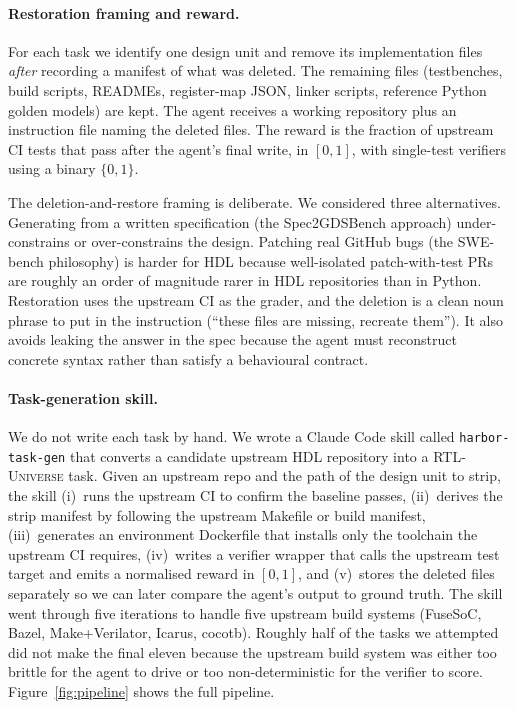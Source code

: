 \documentclass{article}
\begin{document}
\paragraph{Restoration framing and reward.}
For each task we identify one design unit and remove its implementation files \emph{after}
recording a manifest of what was deleted. The remaining files (testbenches, build scripts,
READMEs, register-map JSON, linker scripts, reference Python golden models) are kept. The
agent receives a working repository plus an instruction file naming the deleted files. The
reward is the fraction of upstream CI tests that pass after the agent's final write, in
$[0,1]$, with single-test verifiers using a binary $\{0,1\}$.

The deletion-and-restore framing is deliberate. We considered three alternatives. Generating
from a written specification (the Spec2GDSBench approach) under-constrains or over-constrains
the design. Patching real GitHub bugs (the SWE-bench philosophy) is harder for HDL because
well-isolated patch-with-test PRs are roughly an order of magnitude rarer in HDL repositories
than in Python. Restoration uses the upstream CI as the grader, and the deletion is a clean
noun phrase to put in the instruction (``these files are missing, recreate them''). It also
avoids leaking the answer in the spec because the agent must reconstruct concrete syntax
rather than satisfy a behavioural contract.

\paragraph{Task-generation skill.}
We do not write each task by hand. We wrote a Claude Code skill called
\texttt{harbor-task-gen} that converts a candidate upstream HDL repository into a
\textsc{RTL-Universe} task. Given an upstream repo and the path of the design unit to strip,
the skill (i)~runs the upstream CI to confirm the baseline passes, (ii)~derives the strip
manifest by following the upstream Makefile or build manifest, (iii)~generates an environment
Dockerfile that installs only the toolchain the upstream CI requires, (iv)~writes a verifier
wrapper that calls the upstream test target and emits a normalised reward in $[0,1]$, and
(v)~stores the deleted files separately so we can later compare the agent's output to ground
truth. The skill went through five iterations to handle five upstream build systems (FuseSoC,
Bazel, Make+Verilator, Icarus, cocotb). Roughly half of the tasks we attempted did not make
the final eleven because the upstream build system was either too brittle for the agent to
drive or too non-deterministic for the verifier to score. Figure~\ref{fig:pipeline} shows the
full pipeline.
\end{document}
